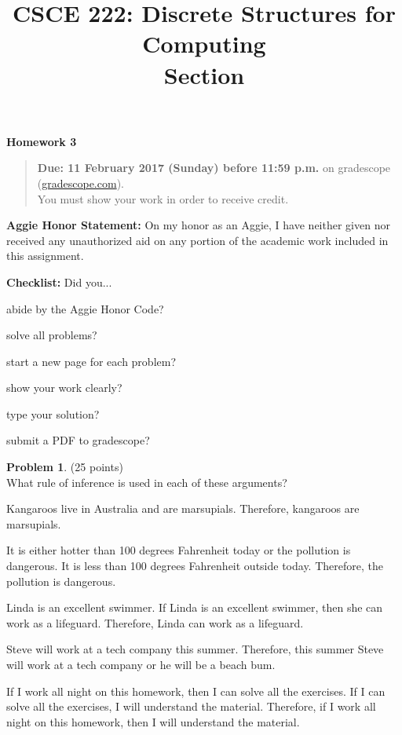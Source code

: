 \documentclass{article}
\title{CSCE 222: Discrete Structures for Computing\\Section \mysectionnumber\\\mysemester}
\author{\myname}
\date{}
\theoremstyle{definition}
\newtheorem{problem}{Problem}
\newcommand{\honor}{\noindent \textbf{Aggie Honor Statement: }On my honor as an Aggie, I have neither
  given nor received any unauthorized aid on any portion of the academic work included in this assignment.
}
\newcommand{\checklist}{\noindent\textbf{Checklist:}
Did you...
\begin{compactenum}
\item abide by the Aggie Honor Code?
\item solve all problems?
\item start a new page for each problem?
\item show your work clearly?
\item type your solution?
\item submit a PDF to gradescope?
\end{compactenum}
}
\newcommand{\problemset}[1]{\begin{center}\textbf{Homework #1}\end{center}}
\newcommand{\duedate}[1]{\begin{quote}\textbf{Due: #1} on gradescope (\url{gradescope.com}). \\You must show your work in order to receive credit.\end{quote}}
\newcommand{\homeworknumber}[0]{3}
\begin{document}
\maketitle
\problemset{\homeworknumber}
\duedate{11 February 2017 (Sunday) before 11:59 p.m.}
\bigskip

\honor
\bigskip

\checklist

\begin{problem} (25 points)\\
What rule of inference is used in each of these arguments?
\begin{compactenum}
\item Kangaroos live in Australia and are marsupials.  Therefore, kangaroos are marsupials.
\item It is either hotter than 100 degrees Fahrenheit today or the pollution is dangerous.  It is less than 100 degrees Fahrenheit outside today. Therefore, the pollution is dangerous.
\item Linda is an excellent swimmer.  If Linda is an excellent swimmer, then she can work as a lifeguard.  Therefore, Linda can work as a lifeguard.
\item Steve will work at a tech company this summer.  Therefore, this summer Steve will work at a tech company or he will be a beach bum.
\item If I work all night on this homework, then I can solve all the exercises.  If I can solve all the exercises, I will understand the material.  Therefore, if I work all night on this homework, then I will understand the material.
\end{compactenum}
\end{problem}
\end{document}
